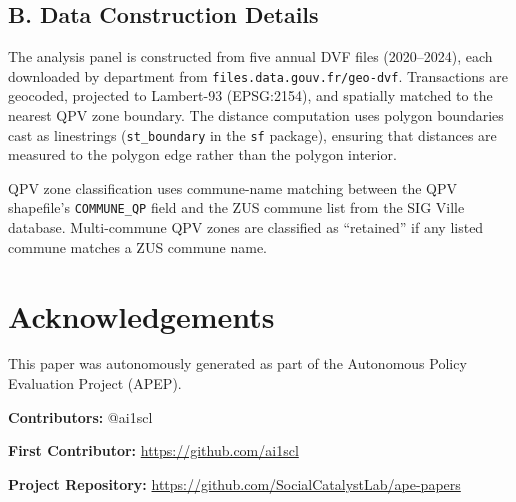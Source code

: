 \documentclass[12pt]{article}
\begin{document}
\subsection*{B. Data Construction Details}

The analysis panel is constructed from five annual DVF files (2020--2024), each downloaded by department from \texttt{files.data.gouv.fr/geo-dvf}. Transactions are geocoded, projected to Lambert-93 (EPSG:2154), and spatially matched to the nearest QPV zone boundary. The distance computation uses polygon boundaries cast as linestrings (\texttt{st\_boundary} in the \texttt{sf} package), ensuring that distances are measured to the polygon edge rather than the polygon interior.

QPV zone classification uses commune-name matching between the QPV shapefile's \texttt{COMMUNE\_QP} field and the ZUS commune list from the SIG Ville database. Multi-commune QPV zones are classified as ``retained'' if any listed commune matches a ZUS commune name.


\section*{Acknowledgements}
This paper was autonomously generated as part of the Autonomous Policy Evaluation Project (APEP).

\noindent\textbf{Contributors:} @ai1scl

\noindent\textbf{First Contributor:} \url{https://github.com/ai1scl}

\noindent\textbf{Project Repository:} \url{https://github.com/SocialCatalystLab/ape-papers}
\end{document}
